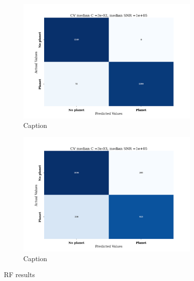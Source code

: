 \begin{figure}[!ht]
\begin{subfigure}[!h]{0.4\textwidth}
    \centering
    \includegraphics[scale=0.3]{images/Chapter3/confusion_RF_CV_1e-02_cmax_1e-01_dsnrmin_1e+04_dsnrmax_1e+06.png}
    \caption{Caption}
    \label{fig:RF1e-1-1e-2}
\end{subfigure}
\hfill
\begin{subfigure}{0.4\textwidth}
    \centering
    \includegraphics[scale=0.3]{images/Chapter3/confusion_RF_CV_1e-03_cmax_1e-02_dsnrmin_1e+04_dsnrmax_1e+06.png}
    \caption{Caption}
    \label{fig:RF1e-3_1e-2}
\end{subfigure}
\caption{RF results}
\end{figure}
